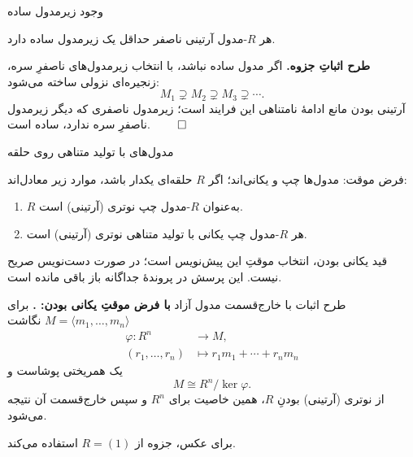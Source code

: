 \begin{frame}[t]{وجود زیرمدول ساده}
    \label{lec11:artinian-simple-submodule}
    \begin{theorem}
        هر $R$-مدول آرتینی ناصفر حداقل یک زیرمدول ساده دارد.
    \end{theorem}
    \textbf{طرح اثباتِ جزوه.}
    اگر مدول ساده نباشد، با انتخاب زیرمدول‌های ناصفرِ سره،
    زنجیره‌ای نزولی ساخته می‌شود:
    \[
        M_1\supsetneq M_2\supsetneq M_3\supsetneq\cdots.
    \]
    آرتینی بودن مانع ادامهٔ نامتناهی این فرایند است؛ زیرمدول ناصفری که
    دیگر زیرمدول ناصفرِ سره ندارد، ساده است.
    \hfill\(\qed\)
\end{frame}

\begin{frame}[t]{مدول‌های با تولید متناهی روی حلقه}
    \label{lec11:regular-module-criterion-pending}
    \begin{tblock}{فرض موقت: مدول‌ها چپ و یکانی‌اند؛ }
        اگر $R$ حلقه‌ای یکدار باشد، موارد زیر معادل‌اند:
        \begin{enumerate}
            \item $R$ به‌عنوان $R$-مدول چپ نوتری \textup{(آرتینی)} است.
            \item هر $R$-مدول چپ یکانی با تولید متناهی نوتری \textup{(آرتینی)} است.
        \end{enumerate}
    \end{tblock}
    قید یکانی بودن، انتخاب موقتِ این پیش‌نویس است؛ در صورت دست‌نویس صریح نیست.
    این پرسش در پروندهٔ جداگانه باز باقی مانده است.
\end{frame}

\begin{frame}[t]{طرح اثبات با خارج‌قسمت مدول آزاد}
    \label{lec11:regular-module-proof-pending}
    \textbf{با فرض موقتِ یکانی بودن: .}
    برای $M=\langle m_1,\ldots,m_n\rangle$ نگاشت
    \[
        \begin{aligned}
            \varphi:R^n&\longrightarrow M,\\
            (r_1,\ldots,r_n)&\longmapsto r_1m_1+\cdots+r_nm_n
        \end{aligned}
    \]
    یک همریختی پوشاست و
    \[
        M\cong R^n/\ker\varphi.
    \]
    از نوتری \textup{(آرتینی)} بودنِ $R$، همین خاصیت برای $R^n$
    و سپس خارج‌قسمت آن نتیجه می‌شود.

    \medskip
    برای عکس، جزوه از $R=(1)$ استفاده می‌کند.
\end{frame}

